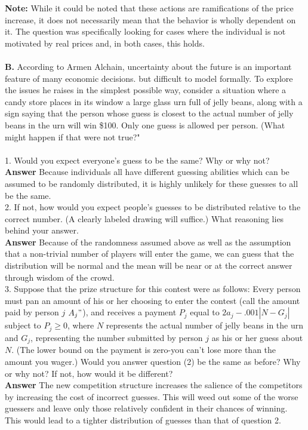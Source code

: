 \documentclass[11pt]{article}
\begin{document}
\textbf{Note:} While it could be noted that these actions are ramifications of the price increase, it does not necessarily mean that the behavior is wholly dependent on it. The question was specifically looking for cases where the individual is not motivated by real prices and, in both cases, this holds.\\
\\
\textbf{B.} According to Armen Alchain, uncertainty about the future is an important feature of many economic decisions. but difficult to model formally. To explore the issues he raises in the simplest possible way, consider a situation where a candy store places in its window a large glass urn full of jelly beans, along with a sign saying that the person whose guess is closest to the actual number of jelly beans in the urn will win \$100. Only one guess is allowed per person. (What might happen if that were not true?"\\
\\
1. Would you expect everyone's guess to be the same? Why or why not?\\
\textbf{Answer} Because individuals all have different guessing abilities which can be assumed to be randomly distributed, it is highly unlikely for these guesses to all be the same. 
\\
2. If not, how would you expect people's guesses to be distributed relative to the correct number. (A clearly labeled drawing will suffice.) What reasoning lies behind your answer.\\
\textbf{Answer} Because of the randomness assumed above as well as the assumption that a non-trivial number of players will enter the game, we can guess that the distribution will be normal and the mean will be near or at the correct answer through wisdom of the crowd.
\\
3. Suppose that the prize structure for this contest were as follows: Every person must pan an amount of his or her choosing to enter the contest (call the amount paid by person $j$ $A_j"$), and receives a payment $P_j$ equal to $2a_j-.001|N-G_j|$ subject to $P_j \geq 0$, where $N$ represents the actual number of jelly beans in the urn and $G_j$, representing the number submitted by person $j$ as his or her guess about $N$. (The lower bound on the payment is zero-you can't lose more than the amount you wager.) Would you answer question (2) be the same as before? Why or why not? If not, how would it be different?\\
\textbf{Answer} The new competition structure increases the salience of the competitors by increasing the cost of incorrect guesses. This will weed out some of the worse guessers and leave only those relatively confident in their chances of winning. This would lead to a tighter distribution of guesses than that of question 2.\\
\end{document}
